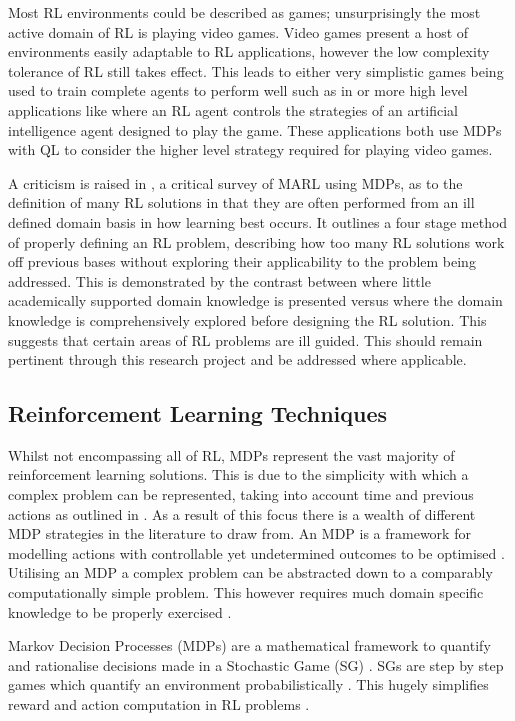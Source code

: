 \documentclass[hidelinks,journal]{IEEEtran}
\begin{document}
Most RL environments could be described as games; unsurprisingly the most active domain of RL is playing video games. Video games present a host of environments easily adaptable to RL applications, however the low complexity tolerance of RL still takes effect. This leads to either very simplistic games being used to train complete agents to perform well such as in \textcite{Bellemare12} or more high level applications like \textcite{Amato10} where an RL agent controls the strategies of an artificial intelligence agent designed to play the game. These applications both use MDPs with QL to consider the higher level strategy required for playing video games.

A criticism is raised in \textcite{Shoham03}, a critical survey of MARL using MDPs, as to the definition of many RL solutions in that they are often performed from an ill defined domain basis in how learning best occurs. It outlines a four stage method of properly defining an RL problem, describing how too many RL solutions work off previous bases without exploring their applicability to the problem being addressed. This is demonstrated by the contrast between \textcite{Amato10} where little academically supported domain knowledge is presented versus \textcite{Ng06} where the domain knowledge is comprehensively explored before designing the RL solution. This suggests that certain areas of RL problems are ill guided. This should remain pertinent through this research project and be addressed where applicable. 

\subsection{Reinforcement Learning Techniques}
\label{subsec:lrRl}
Whilst not encompassing all of RL, MDPs represent the vast majority of reinforcement learning solutions. This is due to the simplicity with which a complex problem can be represented, taking into account time and previous actions as outlined in \textcite{Barto03}. As a result of this focus there is a wealth of different MDP strategies in the literature to draw from. An MDP is a framework for modelling actions with controllable yet undetermined outcomes to be optimised \parencite{Bellman58}. Utilising an MDP a complex problem can be abstracted down to a comparably computationally simple problem. This however requires much domain specific knowledge to be properly exercised \textcite{Shoham03}.

Markov Decision Processes (MDPs) are a mathematical framework to quantify and rationalise decisions made in a Stochastic Game (SG) \parencite{Bellman58}. SGs are step by step games which quantify an environment probabilistically \parencite{Shapley53}. This hugely simplifies reward and action computation in RL problems \parencite{Busoniu08}.
\end{document}
